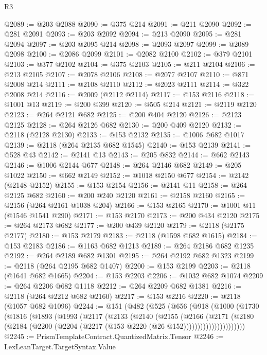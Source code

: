 \begin{lexlean}{R3}
\begin{coremodule}
@2089 := @203 @2088
@2090 := @375 @214
@2091 := @211 @2090
@2092 := @281 @2091
@2093 := @203 @2092
@2094 := @213 @2090
@2095 := @281 @2094
@2097 := @203 @2095 @214
@2098 := @2093 @2097
@2099 := @2089 @2098
@2100 := @2086 @2099
@2101 := @2082 @2100
@2102 := @379 @2101
@2103 := @377 @2102
@2104 := @375 @2103
@2105 := @211 @2104
@2106 := @213 @2105
@2107 := @2078 @2106
@2108 := @2077 @2107
@2110 := @871 @2008 @214
@2111 := @2108 @2110
@2112 := @2023 @2111
@2114 := @322 @2008 @214
@2116 := @2009 (@2112 @2114)
@2117 := @153 @2116
@2118 := @1001 @13
@2119 := @200 @399
@2120 := @505 @214
@2121 := @2119 @2120
@2123 := @264 @2121 @682
@2125 := @200 @404 @2120
@2126 := @2123 @2125
@2128 := @264 @2126 @682
@2130 := @200 @409 @2120
@2132 := @2118 (@2128 @2130)
@2133 := @153 @2132
@2135 := @1006 @682 @1017
@2139 := @2118 (@264 @2135 @682 @1545)
@2140 := @153 @2139
@2141 := @528 @43
@2142 := @2141 @13
@2143 := @205 @832
@2144 := @662 @2143
@2146 := @1006 @2144 @677
@2148 := @264 @2146 @682
@2149 := @205 @1022
@2150 := @662 @2149
@2152 := @1018 @2150 @677
@2154 := @2142 (@2148 @2152)
@2155 := @153 @2154
@2156 := @2141 @11
@2158 := @264 @2125 @682
@2160 := @200 @240 @2120
@2161 := @2158 @2160
@2165 := @2156 (@264 @2161 @1038 @204)
@2166 := @153 @2165
@2170 := @1001 @11 (@1546 @1541 @290)
@2171 := @153 @2170
@2173 := @200 @434 @2120
@2175 := @264 @2173 @682
@2177 := @200 @439 @2120
@2179 := @2118 (@2175 @2177)
@2180 := @153 @2179
@2183 := @2118 (@1598 @682 @1615)
@2184 := @153 @2183
@2186 := @1163 @682 @1213
@2189 := @264 @2186 @682 @1235
@2192 := @264 @2189 @682 @1301
@2195 := @264 @2192 @682 @1323
@2199 := @2118 (@264 @2195 @682 @1407)
@2200 := @153 @2199
@2203 := @2118 (@1641 @682 @1665)
@2204 := @153 @2203
@2206 := @1032 @682 @1074
@2209 := @264 @2206 @682 @1118
@2212 := @264 @2209 @682 @1381
@2216 := @2118 (@264 @2212 @682 @2160)
@2217 := @153 @2216
@2220 := @2118 (@1057 @682 @1096)
@2244 := @151
    (@482
      (@525
        (@656
          (@918
            (@1000
              (@1730
                (@1816
                  (@1893
                    (@1993
                      (@2117
                        (@2133
                          (@2140
                            (@2155
                              (@2166
                                (@2171
                                  (@2180
                                    (@2184
                                      (@2200
                                        (@2204 (@2217 (@153 @2220 (@26 @152))))))))))))))))))))))
@2245 := PrismTemplateContract.QuantizedMatrix.Tensor
@2246 := LexLeanTarget.TargetSyntax.Value

\end{coremodule}
\end{lexlean}
